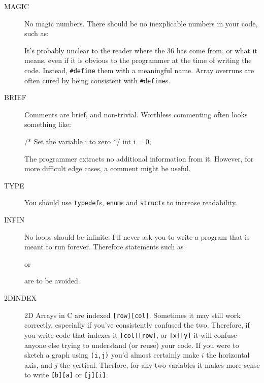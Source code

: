 \begin{description}
\item[MAGIC] No magic numbers. There should be no inexplicable numbers in your code, such
as:
\begin{codesnippet}
	if(i < 36){
\end{codesnippet}

It's probably unclear to the reader where the $36$ has come from, or what it means,
even if it is obvious to the programmer at the time of writing the code. Instead,
\verb^#define^ them with a meaningful name.
Array overruns are often cured by being consistent with \verb^#define^s.

\item[BRIEF] Comments are brief, and non-trivial. Worthless commenting often
looks something like:
\begin{codesnippet}
/* Set the variable i to zero */
int i = 0;
\end{codesnippet}
The programmer extracts no additional information from it. However, for more
difficult edge cases, a comment might be useful.
\begin{codesnippet}
/* Have we reached the end of the list ? */
if(t1->h == NULL){ 
\end{codesnippet}

\item[TYPE] You should use \verb^typedef^s, \verb^enum^s and \verb^struct^s to
increase readability. 

\item[INFIN] No loops should be infinite. I'll never ask you to write a program that is meant to run forever. Therefore statements such as
\begin{codesnippet}
while(1){
\end{codesnippet}
or
\begin{codesnippet}
for(;;;){
\end{codesnippet}
are to be avoided.

\item[2DINDEX] 2D Arrays in C are indexed \verb^[row][col]^.  Sometimes
it may still work correctly, especially if you've consistently confused
the two.  Therefore, if you write code that indexes it \verb^[col][row]^,
or \verb^[x][y]^ it will confuse anyone else trying to understand (or
reuse) your code. If you were to sketch a graph using \verb^(i,j)^ you'd
almost certainly make $i$ the horizontal axis, and $j$ the vertical.
Therfore, for any two variables it makes more sense to write \verb^[b][a]^
or \verb^[j][i]^.

\end{description}
